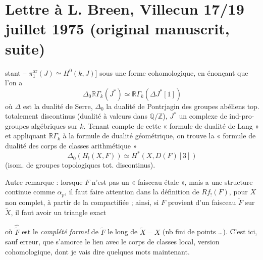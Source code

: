 \documentclass[11pt,a4paper]{article}
\begin{document}
\section{Lettre à L. Breen, Villecun 17/19 juillet 1975 (original manuscrit, suite)}

stant -- $\pi_1^{\mathrm{ar}}(J) \simeq H^0(k, J)$] sous une forme cohomologique, en énonçant que l'on a
\[
\Delta_0 \mathbb{R}\Gamma_k(J^*) \simeq \mathbb{R}\Gamma_k(\Delta J^*[1])
\]
où $\Delta$ est la dualité de Serre, $\Delta_0$ la dualité de Pontrjagin des groupes abéliens top. totalement discontinus (dualité à valeurs dans $\mathbb{Q}/\mathbb{Z}$), $J^*$ un complexe de ind-pro-groupes algébriques sur $k$. Tenant compte de cette « formule de dualité de Lang » et appliquant $\mathbb{R}\Gamma_k$ à la formule de dualité  géométrique, on trouve la « formule de dualité des corps de classes arithmétique »
\[
\boxed{\Delta_0(H_!(X, F)) \simeq H^*(X, D(F)[3])}
\]
(isom. de groupes topologiques tot. discontinus).

Autre remarque : lorsque $F$ n'est pas un « faisceau étale », mais a une structure continue comme $\alpha_p$, il faut faire attention dans la définition de $Rf_!(F)$, pour $X$ non complet, à partir de la compactifiée  ; ainsi, si $F$ provient d'un faisceau  $\tilde{F}$ sur $\tilde{X}$, il faut avoir un triangle exact


où $\hat{\tilde{F}}$ est le \emph{complété formel} de $\tilde{F}$ le long de $\tilde{X} - X$ (nb fini de points …). C'est ici, sauf erreur, que s'amorce le lien avec le corps de classes local, version cohomologique, dont je vais dire quelques mots maintenant.
\end{document}
